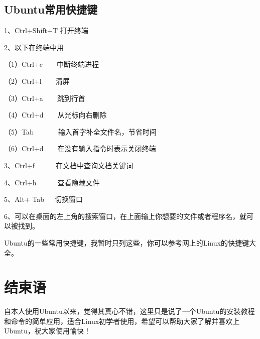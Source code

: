 \documentclass{article}
\begin{document}
\subsection{Ubuntu常用快捷键}
1、Ctrl+Shift+T 打开终端

2、以下在终端中用

  （1）Ctrl+c~~~~中断终端进程

  （2）Ctrl+l~~~~清屏

 （3）Ctrl+a~~~~跳到行首

 （4）Ctrl+d~~~~从光标向右删除

 （5）Tab~~~~~~~输入首字补全文件名，节省时间

  （6）Ctrl+d~~~~在没有输入指令时表示关闭终端

3、Ctrl+f~~~~~~在文档中查询文档关键词 
 
4、Ctrl+h~~~~~~查看隐藏文件

5、Alt+	Tab~~~切换窗口

6、可以在桌面的左上角的搜索窗口，在上面输上你想要的文件或者程序名，就可以被找到。

Ubuntu的一些常用快捷键，我暂时只列这些，你可以参考网上的Linux的快捷键大全。
\section{结束语}
自本人使用Ubuntu以来，觉得其真心不错，这里只是说了一个Ubuntu的安装教程和命令的简单应用，适合Linux初学者使用，希望可以帮助大家了解并喜欢上Ubuntu，祝大家使用愉快！
\end{document}
